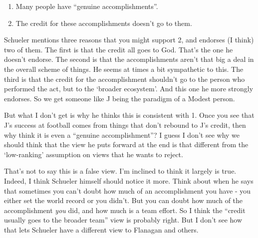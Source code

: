 \documentclass[
]{article}
\providecommand{\tightlist}{%
  \setlength{\itemsep}{0pt}\setlength{\parskip}{0pt}}
\begin{document}
\begin{enumerate}
\def\labelenumi{\arabic{enumi}.}
\tightlist
\item
  Many people have ``genuine accomplishments''.
\item
  The credit for these accomplishments doesn't go to them.
\end{enumerate}

Schueler mentions three reasons that you might support 2, and endorses
(I think) two of them. The first is that the credit all goes to God.
That's the one he doesn't endorse. The second is that the
accomplishments aren't that big a deal in the overall scheme of things.
He seems at times a bit sympathetic to this. The third is that the
credit for the accomplishment shouldn't go to the person who performed
the act, but to the `broader ecosystem'. And this one he more strongly
endorses. So we get someone like J being the paradigm of a Modest
person.

But what I don't get is why he thinks this is consistent with 1. Once
you see that J's success at football comes from things that don't
rebound to J's credit, then why think it is even a ``genuine
accomplishment''? I guess I don't see why we should think that the view
he puts forward at the end is that different from the `low-ranking'
assumption on views that he wants to reject.

That's not to say this is a false view. I'm inclined to think it largely
is true. Indeed, I think Schueler himself should notice it more. Think
about when he says that sometimes you can't doubt how much of an
accomplishment you have - you either set the world record or you didn't.
But you can doubt how much of the accomplishment \emph{you} did, and how
much is a team effort. So I think the ``credit usually goes to the
broader team'' view is probably right. But I don't see how that lets
Schueler have a different view to Flanagan and others.
\end{document}
